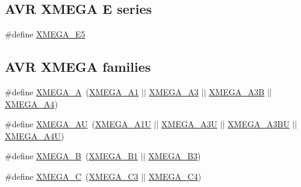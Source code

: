 \subsection*{A\+VR X\+M\+E\+GA E series}
\begin{DoxyCompactItemize}
\item 
\#define \mbox{\hyperlink{group__xmega__part__macros__group_ga3bbcf2e955c9747a3595f8cdc01436ba}{X\+M\+E\+G\+A\+\_\+\+E5}}
\end{DoxyCompactItemize}
\subsection*{A\+VR X\+M\+E\+GA families}
\begin{DoxyCompactItemize}
\item 
\#define \mbox{\hyperlink{group__xmega__part__macros__group_gab903a90d3a0bc99d7248eaecbb325a23}{X\+M\+E\+G\+A\+\_\+A}}~(\mbox{\hyperlink{group__xmega__part__macros__group_gaa0df665226b6faf69dcc137f1b78f074}{X\+M\+E\+G\+A\+\_\+\+A1}} $\vert$$\vert$ \mbox{\hyperlink{group__xmega__part__macros__group_ga831948bd467aa2355eb76ec708d2921a}{X\+M\+E\+G\+A\+\_\+\+A3}} $\vert$$\vert$ \mbox{\hyperlink{group__xmega__part__macros__group_ga32fef354d7f092b04ec41a0733e2c7ae}{X\+M\+E\+G\+A\+\_\+\+A3B}} $\vert$$\vert$ \mbox{\hyperlink{group__xmega__part__macros__group_ga7b83a133489c9896dbdc730615c83be8}{X\+M\+E\+G\+A\+\_\+\+A4}})
\item 
\#define \mbox{\hyperlink{group__xmega__part__macros__group_ga55210f3805902072fce76647b50fa177}{X\+M\+E\+G\+A\+\_\+\+AU}}~(\mbox{\hyperlink{group__xmega__part__macros__group_ga6672329ddee03af905aa378946568b67}{X\+M\+E\+G\+A\+\_\+\+A1U}} $\vert$$\vert$ \mbox{\hyperlink{group__xmega__part__macros__group_gab5232598231cc5c17658e4b7cc5293ec}{X\+M\+E\+G\+A\+\_\+\+A3U}} $\vert$$\vert$ \mbox{\hyperlink{group__xmega__part__macros__group_ga98083f3307fe61cc2377948db87cd708}{X\+M\+E\+G\+A\+\_\+\+A3\+BU}} $\vert$$\vert$ \mbox{\hyperlink{group__xmega__part__macros__group_ga7625edcdd219df905c870d73c1689da6}{X\+M\+E\+G\+A\+\_\+\+A4U}})
\item 
\#define \mbox{\hyperlink{group__xmega__part__macros__group_ga62f2c1c93640237425cb64186ddce219}{X\+M\+E\+G\+A\+\_\+B}}~(\mbox{\hyperlink{group__xmega__part__macros__group_gaa2fd55860a1bbc05c6d0d384e7476596}{X\+M\+E\+G\+A\+\_\+\+B1}} $\vert$$\vert$ \mbox{\hyperlink{group__xmega__part__macros__group_ga7385be70af05a3a61864a4fc470fa39d}{X\+M\+E\+G\+A\+\_\+\+B3}})
\item 
\#define \mbox{\hyperlink{group__xmega__part__macros__group_ga75b06dd59d29b1de54dd73fe67830973}{X\+M\+E\+G\+A\+\_\+C}}~(\mbox{\hyperlink{group__xmega__part__macros__group_ga10c26d10c3df7d9874e4527d1327c60b}{X\+M\+E\+G\+A\+\_\+\+C3}} $\vert$$\vert$ \mbox{\hyperlink{group__xmega__part__macros__group_ga8add217f9d3d28fda40ec91e65a5d970}{X\+M\+E\+G\+A\+\_\+\+C4}})

\end{DoxyCompactItemize}
